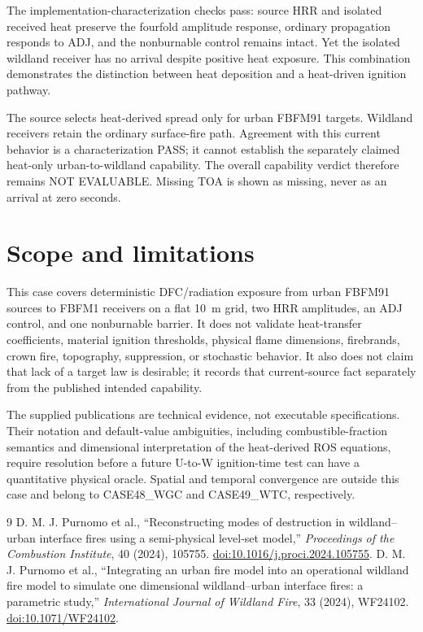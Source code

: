 The implementation-characterization checks pass: source HRR and isolated
received heat preserve the fourfold amplitude response, ordinary propagation
responds to ADJ, and the nonburnable control remains intact. Yet the isolated
wildland receiver has no arrival despite positive heat exposure. This
combination demonstrates the distinction between heat deposition and a
heat-driven ignition pathway.

The source selects heat-derived spread only for urban FBFM91 targets. Wildland
receivers retain the ordinary surface-fire path. Agreement with this current
behavior is a characterization PASS; it cannot establish the separately
claimed heat-only urban-to-wildland capability. The overall capability verdict
therefore remains NOT EVALUABLE. Missing TOA is shown as missing, never as an
arrival at zero seconds.

\section{Scope and limitations}
This case covers deterministic DFC/radiation exposure from urban FBFM91
sources to FBFM1 receivers on a flat \SI{10}{m} grid, two HRR amplitudes, an
ADJ control, and one nonburnable barrier.  It does not validate heat-transfer
coefficients, material ignition thresholds, physical flame dimensions,
firebrands, crown fire, topography, suppression, or stochastic behavior.  It
also does not claim that lack of a target law is desirable; it records that
current-source fact separately from the published intended capability.

The supplied publications are technical evidence, not executable
specifications.  Their notation and default-value ambiguities, including
combustible-fraction semantics and dimensional interpretation of the
heat-derived ROS equations, require resolution before a future U-to-W
ignition-time test can have a quantitative physical oracle.  Spatial and
temporal convergence are outside this case and belong to CASE48\_WGC and
CASE49\_WTC, respectively.

\begin{thebibliography}{9}
 D. M. J. Purnomo et al., ``Reconstructing modes of destruction in wildland--urban interface fires using a semi-physical level-set model,'' \emph{Proceedings of the Combustion Institute}, 40 (2024), 105755. \href{https://doi.org/10.1016/j.proci.2024.105755}{doi:10.1016/j.proci.2024.105755}.
 D. M. J. Purnomo et al., ``Integrating an urban fire model into an operational wildland fire model to simulate one dimensional wildland--urban interface fires: a parametric study,'' \emph{International Journal of Wildland Fire}, 33 (2024), WF24102. \href{https://doi.org/10.1071/WF24102}{doi:10.1071/WF24102}.
\end{thebibliography}
